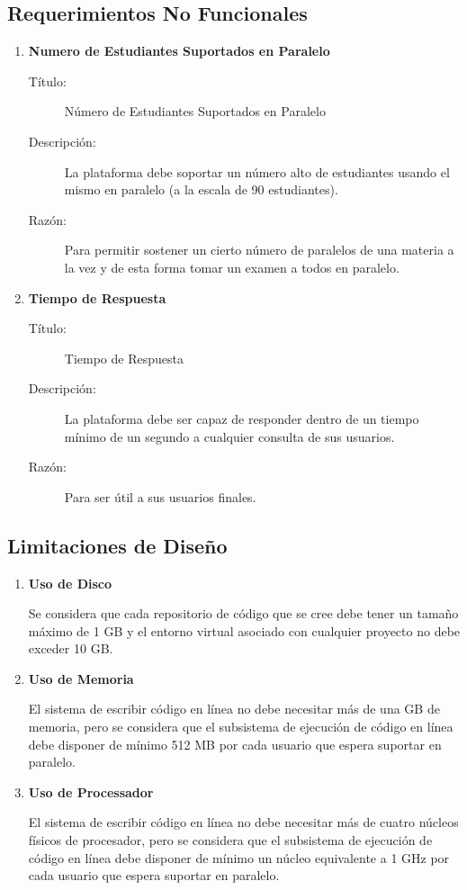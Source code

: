 \subsection{Requerimientos No Funcionales}

\begin{enumerate}
	\item \textbf{Numero de Estudiantes Suportados en Paralelo}
    \begin{description}
        \item[Título:] Número de Estudiantes Suportados en Paralelo
        \item[Descripción:] La plataforma debe soportar un número alto de estudiantes usando el mismo en paralelo (a la escala de 90 estudiantes).
        \item[Razón:] Para permitir sostener un cierto número de paralelos de una materia a la vez y de esta forma tomar un examen a todos en paralelo.
    \end{description}
	\item \textbf{Tiempo de Respuesta}
    \begin{description}
		\item[Título:] Tiempo de Respuesta
		\item[Descripción:] La plataforma debe ser capaz de responder dentro de un tiempo mínimo de un segundo a cualquier consulta de sus usuarios.
		\item[Razón:] Para ser útil a sus usuarios finales.
    \end{description}
\end{enumerate}

\subsection{Limitaciones de Diseño}

\begin{enumerate}
\item \textbf{Uso de Disco}

Se considera que cada repositorio de código que se cree debe tener un tamaño máximo de 1 GB y el entorno virtual asociado con cualquier proyecto no debe exceder 10 GB.
\item \textbf{Uso de Memoria}

El sistema de escribir código en línea no debe necesitar más de una GB de memoria, pero se considera que el subsistema de ejecución de código en línea debe disponer de mínimo 512 MB por cada usuario que espera suportar en paralelo.

\item \textbf{Uso de Processador}

El sistema de escribir código en línea no debe necesitar más de cuatro núcleos físicos de procesador, pero se considera que el subsistema de ejecución de código en línea debe disponer de mínimo un núcleo equivalente a 1 GHz por cada usuario que espera suportar en paralelo.
\end{enumerate}

